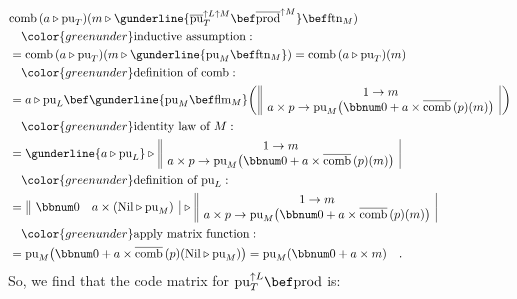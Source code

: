 \begin{align*}
 & \text{comb}\,(a\triangleright\text{pu}_{T})(m\triangleright\gunderline{\overline{\text{pu}}_{T}^{\uparrow L\uparrow M}\bef\overline{\text{prod}}^{\uparrow M}}\bef\text{ftn}_{M})\\
 & \quad{\color{greenunder}\text{inductive assumption}:}\quad\\
 & =\text{comb}\,(a\triangleright\text{pu}_{T})(m\triangleright\gunderline{\text{pu}_{M}\bef\text{ftn}_{M}})=\text{comb}\,(a\triangleright\text{pu}_{T})(m)\\
 & \quad{\color{greenunder}\text{definition of }\text{comb}:}\quad\\
 & =a\triangleright\text{pu}_{L}\bef\gunderline{\text{pu}_{M}\bef\text{flm}_{M}}\bigg(\,\begin{array}{||c|}
1\rightarrow m\\
a\times p\rightarrow\text{pu}_{M}\big(\bbnum 0+a\times\overline{\text{comb}}\,(p)(m)\big)
\end{array}\,\bigg)\\
 & \quad{\color{greenunder}\text{identity law of }M:}\quad\\
 & =\gunderline{a\triangleright\text{pu}_{L}}\triangleright\,\begin{array}{||c|}
1\rightarrow m\\
a\times p\rightarrow\text{pu}_{M}\big(\bbnum 0+a\times\overline{\text{comb}}\,(p)(m)\big)
\end{array}\\
 & \quad{\color{greenunder}\text{definition of }\text{pu}_{L}:}\quad\\
 & =\,\begin{array}{||cc|}
\bbnum 0 & a\times(\text{Nil}\triangleright\text{pu}_{M})\end{array}\,\triangleright\,\begin{array}{||c|}
1\rightarrow m\\
a\times p\rightarrow\text{pu}_{M}\big(\bbnum 0+a\times\overline{\text{comb}}\,(p)(m)\big)
\end{array}\\
 & \quad{\color{greenunder}\text{apply matrix function}:}\quad\\
 & =\text{pu}_{M}\big(\bbnum 0+a\times\overline{\text{comb}}\,(p)(\text{Nil}\triangleright\text{pu}_{M})\big)=\text{pu}_{M}(\bbnum 0+a\times m)\quad.
\end{align*}
So, we find that the code matrix for $\text{pu}_{T}^{\uparrow L}\bef\text{prod}$
is:
